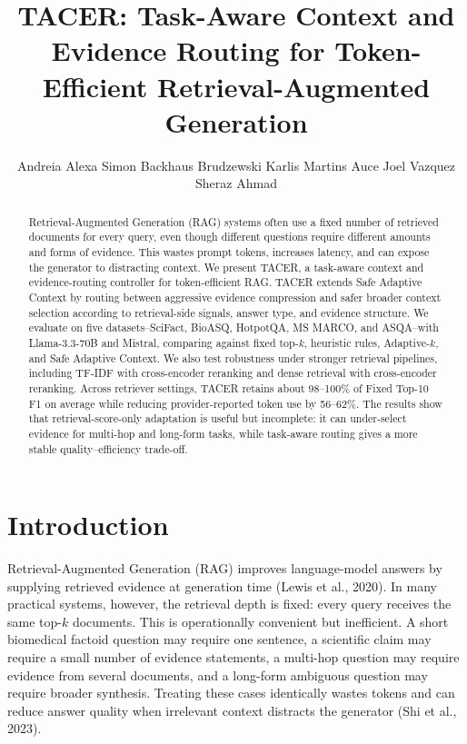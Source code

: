 \documentclass[11pt]{article}
\title{TACER: Task-Aware Context and Evidence Routing for Token-Efficient Retrieval-Augmented Generation}
\author{Andreia Alexa \And Simon Backhaus Brudzewski \And Karlis Martins Auce \AND Joel Vazquez \And Sheraz Ahmad}
\begin{document}
\maketitle

\begin{abstract}
Retrieval-Augmented Generation (RAG) systems often use a fixed number of retrieved documents for every query, even though different questions require different amounts and forms of evidence. This wastes prompt tokens, increases latency, and can expose the generator to distracting context. We present TACER, a task-aware context and evidence-routing controller for token-efficient RAG. TACER extends Safe Adaptive Context by routing between aggressive evidence compression and safer broader context selection according to retrieval-side signals, answer type, and evidence structure. We evaluate on five datasets--SciFact, BioASQ, HotpotQA, MS MARCO, and ASQA--with Llama-3.3-70B and Mistral, comparing against fixed top-$k$, heuristic rules, Adaptive-$k$, and Safe Adaptive Context. We also test robustness under stronger retrieval pipelines, including TF-IDF with cross-encoder reranking and dense retrieval with cross-encoder reranking. Across retriever settings, TACER retains about 98--100\% of Fixed Top-10 F1 on average while reducing provider-reported token use by 56--62\%. The results show that retrieval-score-only adaptation is useful but incomplete: it can under-select evidence for multi-hop and long-form tasks, while task-aware routing gives a more stable quality--efficiency trade-off.
\end{abstract}

\section{Introduction}

Retrieval-Augmented Generation (RAG) improves language-model answers by supplying retrieved evidence at generation time (Lewis et al., 2020). In many practical systems, however, the retrieval depth is fixed: every query receives the same top-$k$ documents. This is operationally convenient but inefficient. A short biomedical factoid question may require one sentence, a scientific claim may require a small number of evidence statements, a multi-hop question may require evidence from several documents, and a long-form ambiguous question may require broader synthesis. Treating these cases identically wastes tokens and can reduce answer quality when irrelevant context distracts the generator (Shi et al., 2023).
\end{document}
